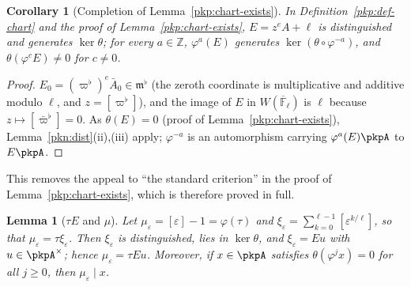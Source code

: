 \documentclass[10pt]{amsart}
\newtheorem{lemma}[theorem]{Lemma}
\newtheorem{corollary}[theorem]{Corollary}
\theoremstyle{definition}
\theoremstyle{remark}
\newcommand{\Z}{\mathbb Z}
\begin{document}
\begin{corollary}[Completion of Lemma~\ref{pkp:chart-exists}]\label{pkn:E-gen}
In Definition~\ref{pkp:def-chart} and the proof of Lemma~\ref{pkp:chart-exists}, $E=z^eA+\ell$ is
distinguished and generates $\ker\theta$; for every $a\in\Z$, $\varphi^a(E)$ generates
$\ker(\theta\circ\varphi^{-a})$, and $\theta(\varphi^c E)\ne0$ for $c\ne0$.
\end{corollary}

\begin{proof}
$E_0=(\varpi^\flat)^e\bar A_0\in\mathfrak m^\flat$ (the zeroth coordinate is multiplicative and additive
modulo $\ell$, and $z=[\varpi^\flat]$), and the image of $E$ in $W(\overline{\mathbb F}_\ell)$ is $\ell$
because $z\mapsto[\bar\varpi^\flat]=0$. As $\theta(E)=0$ (proof of Lemma~\ref{pkp:chart-exists}),
Lemma~\ref{pkn:dist}(ii),(iii) apply; $\varphi^{-a}$ is an automorphism carrying $\varphi^a(E)\pkpA$ to
$E\pkpA$.
\end{proof}

This removes the appeal to ``the standard criterion'' in the proof of Lemma~\ref{pkp:chart-exists},
which is therefore proved in full.

\begin{lemma}[$\tau E$ and $\mu$]\label{pkn:mu}
Let $\mu_\varepsilon=[\varepsilon]-1=\varphi(\tau)$ and $\xi_\varepsilon=\sum_{k=0}^{\ell-1}[\varepsilon^{k/\ell}]$,
so that $\mu_\varepsilon=\tau\xi_\varepsilon$. Then $\xi_\varepsilon$ is distinguished, lies in
$\ker\theta$, and $\xi_\varepsilon=Eu$ with $u\in\pkpA^\times$; hence $\mu_\varepsilon=\tau Eu$.
Moreover, if $x\in\pkpA$ satisfies $\theta(\varphi^jx)=0$ for all $j\ge0$, then $\mu_\varepsilon\mid x$.
\end{lemma}
\end{document}

